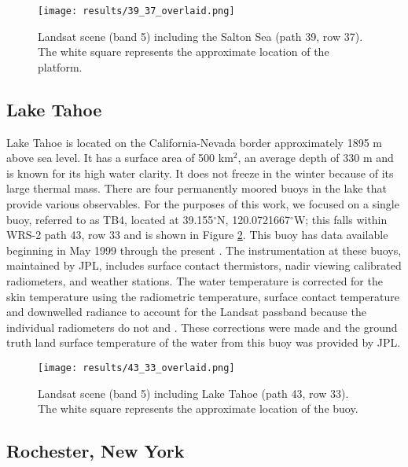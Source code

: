 \documentclass{book}
\begin{document}
\begin{figure}[H]
\centering
\texttt{[image: results/39\_37\_overlaid.png]}
\caption{Landsat scene (band 5) including the Salton Sea (path 39, row 37).  The white square represents the approximate location of the platform.}
\label{fig:39_37_overlaid}
\end{figure}

\subsection{Lake Tahoe}
\label{sec:laketahoe}

Lake Tahoe is located on the California-Nevada border approximately 1895 m above sea level.  It has a surface area of 500 km$^2$, an average depth of 330 m and is known for its high water clarity.  It does not freeze in the winter because of its large thermal mass.  There are four permanently moored buoys in the lake that provide various observables.    For the purposes of this work, we focused on a single buoy, referred to as TB4, located at 39.155$^\circ$N, 120.0721667$^\circ$W; this falls within WRS-2 path 43, row 33 and is shown in Figure \ref{fig:43_33_overlaid}.  This buoy has data available beginning in May 1999 through the present \cite{hook_tahoe}.  The instrumentation at these buoys, maintained by JPL, includes surface contact thermistors, nadir viewing calibrated radiometers, and weather stations.  The water temperature is corrected for the skin temperature using the radiometric temperature, surface contact temperature and downwelled radiance to account for the Landsat passband because the individual radiometers do not \cite{hook_2004} and \cite{hook_2007}.  These corrections were made and the ground truth land surface temperature of the water from this buoy was provided by JPL.

\begin{figure}[H]
\centering
\texttt{[image: results/43\_33\_overlaid.png]}
\caption{Landsat scene (band 5) including Lake Tahoe (path 43, row 33).  The white square represents the approximate location of the buoy.}
\label{fig:43_33_overlaid}
\end{figure}

\subsection{Rochester, New York}
\label{sec:rochester}
\end{document}
